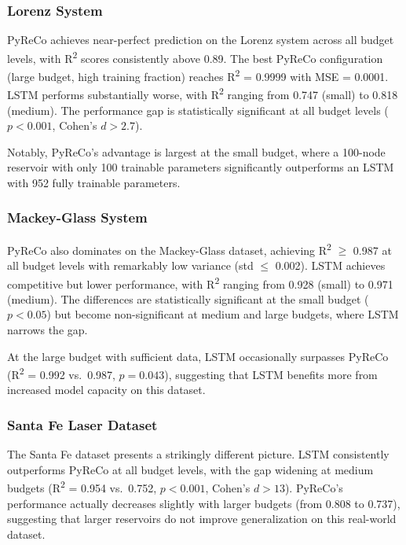 \subsubsection{Lorenz System}

PyReCo achieves near-perfect prediction on the Lorenz system across all budget levels, with R\textsuperscript{2} scores consistently above 0.89. The best PyReCo configuration (large budget, high training fraction) reaches R\textsuperscript{2} = 0.9999 with MSE = 0.0001. LSTM performs substantially worse, with R\textsuperscript{2} ranging from 0.747 (small) to 0.818 (medium). The performance gap is statistically significant at all budget levels ($p < 0.001$, Cohen's $d > 2.7$).

Notably, PyReCo's advantage is largest at the small budget, where a 100-node reservoir with only 100 trainable parameters significantly outperforms an LSTM with 952 fully trainable parameters.

\subsubsection{Mackey-Glass System}

PyReCo also dominates on the Mackey-Glass dataset, achieving R\textsuperscript{2} $\geq$ 0.987 at all budget levels with remarkably low variance (std $\leq$ 0.002). LSTM achieves competitive but lower performance, with R\textsuperscript{2} ranging from 0.928 (small) to 0.971 (medium). The differences are statistically significant at the small budget ($p < 0.05$) but become non-significant at medium and large budgets, where LSTM narrows the gap.

At the large budget with sufficient data, LSTM occasionally surpasses PyReCo (R\textsuperscript{2} = 0.992 vs.\ 0.987, $p = 0.043$), suggesting that LSTM benefits more from increased model capacity on this dataset.

\subsubsection{Santa Fe Laser Dataset}

The Santa Fe dataset presents a strikingly different picture. LSTM consistently outperforms PyReCo at all budget levels, with the gap widening at medium budgets (R\textsuperscript{2} = 0.954 vs.\ 0.752, $p < 0.001$, Cohen's $d > 13$). PyReCo's performance actually decreases slightly with larger budgets (from 0.808 to 0.737), suggesting that larger reservoirs do not improve generalization on this real-world dataset.

